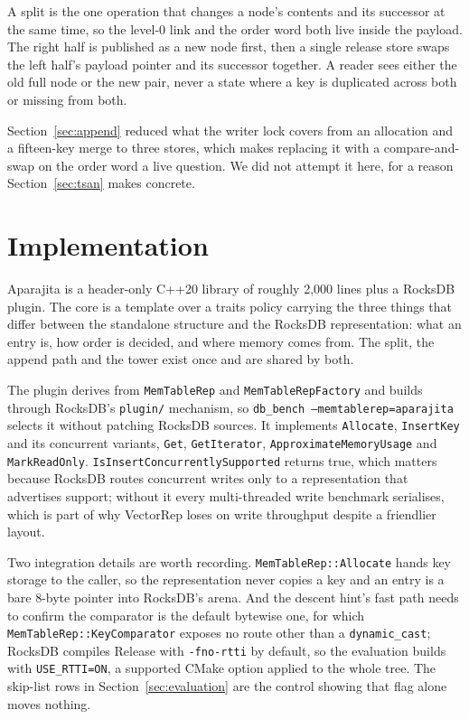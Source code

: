 \documentclass[conference]{IEEEtran}
\begin{document}
A split is the one operation that changes a node's contents and its successor at
the same time, so the level-0 link and the order word both live inside the
payload. The right half is published as a new node first, then a single release
store swaps the left half's payload pointer and its successor together. A reader
sees either the old full node or the new pair, never a state where a key is
duplicated across both or missing from both.

Section~\ref{sec:append} reduced what the writer lock covers from an allocation
and a fifteen-key merge to three stores, which makes replacing it with a
compare-and-swap on the order word a live question. We did not attempt it here,
for a reason Section~\ref{sec:tsan} makes concrete.

\section{Implementation}

Aparajita is a header-only C++20 library of roughly 2{,}000 lines plus a RocksDB
plugin. The core is a template over a traits policy carrying the three things that
differ between the standalone structure and the RocksDB representation: what an
entry is, how order is decided, and where memory comes from. The split, the
append path and the tower exist once and are shared by both.

The plugin derives from \texttt{MemTableRep} and \texttt{MemTableRepFactory} and
builds through RocksDB's \texttt{plugin/} mechanism, so \texttt{db\_bench
--memtablerep=aparajita} selects it without patching RocksDB sources. It
implements \texttt{Allocate}, \texttt{InsertKey} and its concurrent variants,
\texttt{Get}, \texttt{GetIterator}, \texttt{ApproximateMemoryUsage} and
\texttt{MarkReadOnly}. \texttt{IsInsertConcurrentlySupported} returns true, which
matters because RocksDB routes concurrent writes only to a representation that
advertises support; without it every multi-threaded write benchmark serialises,
which is part of why VectorRep loses on write throughput despite a friendlier
layout.

Two integration details are worth recording. \texttt{MemTableRep::Allocate} hands
key storage to the caller, so the representation never copies a key and an entry
is a bare 8-byte pointer into RocksDB's arena. And the descent hint's fast path
needs to confirm the comparator is the default bytewise one, for which
\texttt{MemTableRep::KeyComparator} exposes no route other than a
\texttt{dynamic\_cast}; RocksDB compiles Release with \texttt{-fno-rtti} by
default, so the evaluation builds with \texttt{USE\_RTTI=ON}, a supported CMake
option applied to the whole tree. The skip-list rows in
Section~\ref{sec:evaluation} are the control showing that flag alone moves
nothing.
\end{document}
